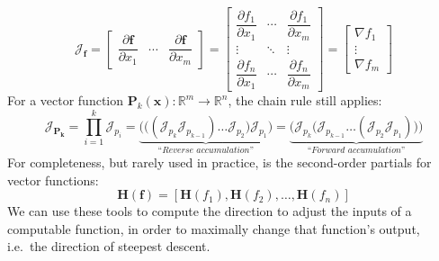\documentclass[12pt,initial,twoside,maitrise]{dms}
\numberwithin{equation}{section}
\numberwithin{table}{chapter}
\numberwithin{figure}{chapter}
\begin{document}
\begin{equation}
\mathcal{J}_{\mathbf{f}} =
\begin{bmatrix}
    \dfrac{\partial \mathbf{f}}{\partial x_1} & \cdots & \dfrac{\partial \mathbf{f}}{\partial x_m}
\end{bmatrix} =
\begin{bmatrix}
    \dfrac{\partial f_1}{\partial x_1} & \cdots & \dfrac{\partial f_1}{\partial x_m}\\
    \vdots & \ddots & \vdots\\
    \dfrac{\partial f_n}{\partial x_1} & \cdots & \dfrac{\partial f_n}{\partial x_m}
\end{bmatrix} =
\begin{bmatrix}
    \nabla f_1 \\
    \vdots \\
    \nabla f_m
\end{bmatrix}
\end{equation}
%
For a vector function $\mathbf{P}_k(\mathbf{x}): \mathbb{R}^m\rightarrow\mathbb{R}^n$, the chain rule still applies:
%
\begin{equation} \label{eq:vfun_chain_rule}
\mathcal{J}_\mathbf{P_k} = \displaystyle \prod_{i=1}^{k} \mathcal{J}_{p_i} = \underbrace{\bigg(\Big((\mathcal{J}_{p_k} \mathcal{J}_{p_{k-1}}) \dots \mathcal{J}_{p_2}\Big) \mathcal{J}_{p_1}\bigg)}_{\textit{``Reverse accumulation''}} = \underbrace{\bigg(\mathcal{J}_{p_k} \Big(\mathcal{J}_{p_{k-1}} \dots (\mathcal{J}_{p_2} \mathcal{J}_{p_1})\Big)\bigg)}_{\textit{``Forward accumulation''}}
\end{equation}
%
For completeness, but rarely used in practice, is the second-order partials for vector functions:
%
\begin{equation}
\mathbf{H} (\mathbf {f} )=[\mathbf {H} (f_{1}), \mathbf {H} (f_{2}), \dots, \mathbf {H} (f_{n})]
\end{equation}
%
We can use these tools to compute the direction to adjust the inputs of a computable function, in order to maximally change that function's output, i.e.\ the direction of steepest descent.
\end{document}
